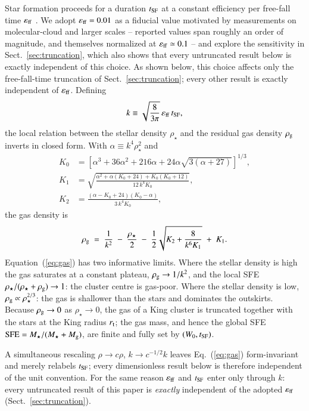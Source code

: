 \documentclass{aa}
\newcommand{\sfe}{{\rm SFE}}
\newcommand{\rtid}{r_{\rm t}}
\newcommand{\tsf}{t_{\rm SF}}
\newcommand{\effE}{\varepsilon_{\rm ff}}
\begin{document}
Star formation proceeds for a duration $\tsf$ at a constant efficiency
per free-fall time $\effE$ \citep{KrumholzMcKee2005,Parmentier2013}. We
adopt $\effE=0.01$ as a fiducial value motivated by measurements on
molecular-cloud and larger scales
\citep{KrumholzMcKeeBlandHawthorn2019,Utomo2018,Pokhrel2021} -- reported
values span roughly an order of magnitude, and \citet{Parmentier2013}
themselves normalized at $\effE\simeq0.1$ -- and explore the sensitivity
in Sect.~\ref{sec:truncation}, which also shows that every untruncated
result below is exactly independent of this choice. As shown below, this
choice affects only the free-fall-time truncation of
Sect.~\ref{sec:truncation}; every other result is exactly independent of
$\effE$. Defining
\begin{equation}
  k \equiv \sqrt{\frac{8}{3\pi}}\, \effE\, \tsf ,
  \label{eq:k}
\end{equation}
the local \citet{Parmentier2013} relation between the stellar density
$\rho_\star$ and the residual gas density $\rho_{\rm g}$ inverts in
closed form. With $\alpha\equiv k^4\rho_\star^2$ and
\begin{align}
  K_0 &= \left[\alpha^3+36\alpha^2+216\alpha
        +24\alpha\sqrt{3(\alpha+27)}\right]^{1/3}, \nonumber\\
  K_1 &= \sqrt{\frac{\alpha^2+\alpha(K_0+24)+K_0(K_0+12)}{12\,k^4K_0}},
        \nonumber\\
  K_2 &= \frac{(\alpha-K_0+24)(K_0-\alpha)}{3\,k^4K_0},
\end{align}
the gas density is
\begin{equation}
  \rho_{\rm g} \;=\; \frac{1}{k^2} \;-\; \frac{\rho_\star}{2}
  \;-\; \frac{1}{2}\sqrt{K_2+\frac{8}{k^6 K_1}} \;+\; K_1 .
  \label{eq:gas}
\end{equation}
Equation~(\ref{eq:gas}) has two informative limits. Where the stellar
density is high the gas saturates at a constant plateau,
$\rho_{\rm g}\rightarrow1/k^2$, and the local SFE
$\rho_\star/(\rho_\star+\rho_{\rm g})\rightarrow1$: the cluster centre is
gas-poor. Where the stellar density is low,
$\rho_{\rm g}\propto\rho_\star^{2/3}$: the gas is shallower than the
stars and dominates the outskirts. Because
$\rho_{\rm g}\rightarrow0$ as $\rho_\star\rightarrow0$, the gas of a King
cluster is truncated together with the stars at the King radius
$\rtid$; the gas mass, and hence the global SFE
$\sfe=M_\star/(M_\star+M_{\rm g})$, are finite and fully set by
$(W_0,\tsf)$.

A simultaneous rescaling $\rho\rightarrow c\rho$,
$k\rightarrow c^{-1/2}k$ leaves Eq.~(\ref{eq:gas}) form-invariant and
merely relabels $\tsf$; every dimensionless result below is therefore
independent of the unit convention. For the same reason $\effE$ and
$\tsf$ enter only through $k$: every untruncated result of this paper is
\emph{exactly} independent of the adopted $\effE$
(Sect.~\ref{sec:truncation}).
\end{document}
